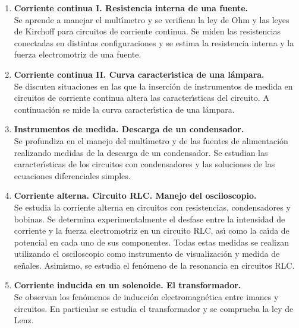 \begin{enumerate} [{\bf I.}]
\begin{enumerate} [{\bf 1. }]

\item {\bf   Corriente continua I. Resistencia interna de una fuente.}\\
Se aprende a manejar el mult\'{\i}metro y se verifican la ley de Ohm
y las leyes de Kirchoff para circuitos de corriente continua.
 Se miden las resistencias conectadas en distintas configuraciones
 y se estima
 la resistencia interna y la fuerza electromotriz de una fuente.
\item {\bf   Corriente continua II. Curva caracter\'{\i}stica de una 
l\'{a}mpara.}\\
Se discuten situaciones en las que la inserci\'{o}n de instrumentos
de medida en circuitos de corriente continua altera las caracter\'{\i}sticas
del circuito. A continuaci\'{o}n se mide la curva caracter\'{\i}stica de una 
l\'{a}mpara.
\item {\bf  Instrumentos de medida. Descarga de un condensador.}\\
Se profundiza en el manejo del mult\'{\i}metro y de las fuentes de 
alimentaci\'{o}n
realizando medidas de la descarga de un condensador.
Se estudian las caracter\'{\i}sticas de los circuitos con condensadores
y las soluciones de las ecuaciones diferenciales simples. 
 \item {\bf   Corriente alterna. Circuito RLC. Manejo del osciloscopio.}\\
Se estudia la corriente alterna en circuitos con resistencias, condensadores 
y bobinas. Se determina experimentalmente el desfase entre
 la intensidad de corriente y la fuerza electromotriz en un circuito RLC,
 as\'{\i} como la ca\'{\i}da de potencial en cada uno de sus componentes.
 Todas estas medidas se realizan utilizando el osciloscopio como
 instrumento de visualizaci\'{o}n y medida de se\~{n}ales.
 Asimismo, se estudia el fen\'{o}meno de la resonancia en circuitos RLC.
\item {\bf   Corriente inducida en  un solenoide. El transformador.}\\
Se observan los fen\'{o}menos de
 inducci\'{o}n electromagn\'{e}tica entre imanes y circuitos.
 En particular se estudia el transformador y se comprueba 
la ley de Lenz.


\end{enumerate}



\end{enumerate}





